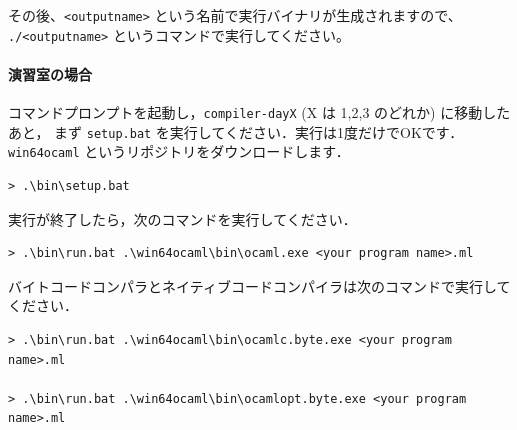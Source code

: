 \documentclass[a4paper,11pt]{jsarticle}
\begin{document}
その後、\verb|<outputname>| という名前で実行バイナリが生成されますので、
\verb|./<outputname>| というコマンドで実行してください。

\paragraph*{演習室の場合}

コマンドプロンプトを起動し，\verb|compiler-dayX| (X は 1,2,3 のどれか) に移動したあと，
まず \verb|setup.bat| を実行してください．実行は1度だけでOKです．\verb|win64ocaml| というリポジトリをダウンロードします．

\begin{lstlisting}
> .\bin\setup.bat
\end{lstlisting}

実行が終了したら，次のコマンドを実行してください．

\begin{lstlisting}
> .\bin\run.bat .\win64ocaml\bin\ocaml.exe <your program name>.ml
\end{lstlisting}

バイトコードコンパラとネイティブコードコンパイラは次のコマンドで実行してください．

\begin{lstlisting}
> .\bin\run.bat .\win64ocaml\bin\ocamlc.byte.exe <your program name>.ml

> .\bin\run.bat .\win64ocaml\bin\ocamlopt.byte.exe <your program name>.ml
\end{lstlisting}






\end{document}
